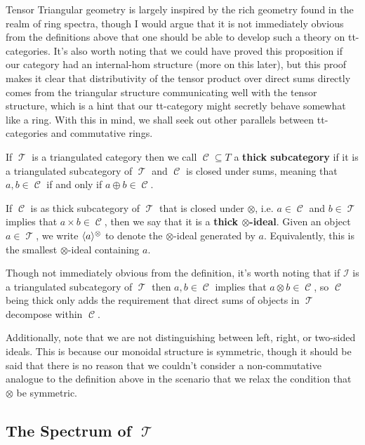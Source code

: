 \documentclass[11pt]{article}
\DeclareMathOperator{\CC}{\mathcal{C}}
\DeclareMathOperator{\TT}{\mathcal{T}}
\begin{document}
\begin{rmk}
Tensor Triangular geometry is largely inspired by the rich geometry found in the realm of ring spectra, though I would argue that it is not immediately obvious from the definitions above that one should be able to develop such a theory on tt-categories. It's also worth noting that we could have proved this proposition if our category had an internal-hom structure (more on this later), but this proof makes it clear that distributivity of the tensor product over direct sums directly comes from the triangular structure communicating well with the tensor structure, which is a hint that our tt-category might secretly behave somewhat like a ring. With this in mind, we shall seek out other parallels between tt-categories and commutative rings.
\end{rmk}

\begin{defn}
If $\TT$ is a triangulated category then we call $\CC \subseteq T$ a \textbf{thick subcategory} if it is a triangulated subcategory of $\TT$ and $\CC$ is closed under sums, meaning that $a,b \in \CC$ if and only if $a \oplus b \in \CC$.

If $\CC$ is as thick subcategory of $\TT$ that is closed under $\otimes$, i.e. $a \in \CC$ and $b \in \TT$ implies that $a \times b \in \CC$, then we say that it is a \textbf{thick $\otimes$-ideal}. Given an object $a \in \TT$, we write $\langle a \rangle^\otimes$ to denote the $\otimes$-ideal generated by $a$. Equivalently, this is the smallest $\otimes$-ideal containing $a$.
\end{defn}

\begin{rmk}
Though not immediately obvious from the definition, it's worth noting that if $\mathcal{I}$ is a triangulated subcategory of $\TT$ then $a,b \in \CC$ implies that $a \otimes b \in \CC$, so $\CC$ being thick only adds the requirement that direct sums of objects in $\TT$ decompose within $\CC$.

Additionally, note that we are not distinguishing between left, right, or two-sided ideals. This is because our monoidal structure is symmetric, though it should be said that there is no reason that we couldn't consider a non-commutative analogue to the definition above in the scenario that we relax the condition that $\otimes$ be symmetric.
\end{rmk}

\subsection{The Spectrum of $\TT$}
\end{document}
